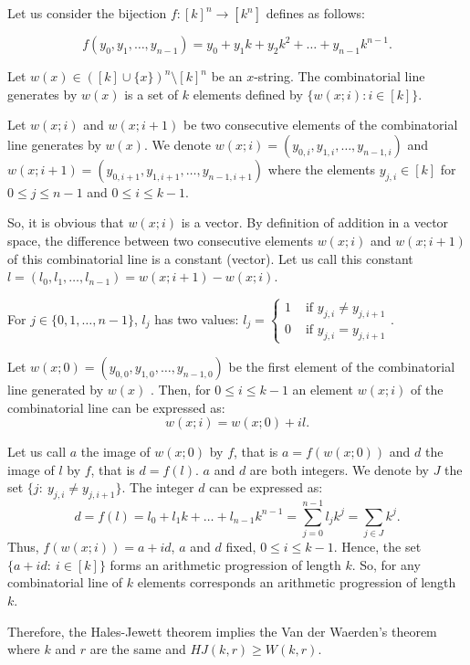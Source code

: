 Let us consider the bijection $f:[k]^n \longrightarrow [k^n]$ defines as follows:

$$f(y_0,y_1,\ldots, y_{n-1})=y_0+y_1k+y_2 k^2+\ldots+y_{n-1}k^{n-1}.$$

Let $w(x) \in ([k] \cup \{x\})^n\setminus [k]^n$ be an $x$-string. The combinatorial line generates by $w(x)$ is a set of $k$ elements defined by  $\{w(x;i):i\in [k]\}.$  

Let $w(x;i)$ and $w(x;i+1)$ be two consecutive elements of the combinatorial line generates by $w(x)$. We denote  $w(x;i)=(y_{0,i},y_{1,i},\ldots, y_{n-1,i}) $ and $w(x;i+1)=(y_{0,i+1},y_{1,i+1},\ldots, y_{n-1,i+1})$ where  the elements  $y_{j,i} \in [k]$ for $0 \leq j \leq n-1$ and $0 \leq i \leq k-1.$

So, it is obvious that $w(x;i)$ is a vector. By definition of addition in a vector space, the difference between two consecutive elements $w(x;i)$ and $w(x;i+1)$ of this combinatorial line is a constant (vector). Let us call this constant $l=(l_0, l_1, \ldots, l_{n-1})= w(x;i+1)-w(x;i)$.


For $j\in \{0,1,\ldots, n-1\}$, $l_j$ has two values: 
$l_j= \left\lbrace \begin{array}{ll}1 & \text{ if } y_{j,i}\neq y_{j,i+1} \\ 0 & \text{ if } y_{j,i} =  y_{j,i+1}   \end{array} \right. .$

Let $w(x;0)=(y_{0,0},y_{1,0},\ldots, y_{n-1,0})$ be the first element of the combinatorial line generated by $w(x)$ . Then, for $0\leq i \leq k-1$ an element $w(x;i)$ of the combinatorial line can be expressed as: $$w(x;i)=w(x;0)+il.$$

Let us call  $a$ the image of $w(x;0)$ by $f$, that is $a=f(w(x;0))$ and  $d$ the image of $l$ by $f$, that is $d=f(l).$ $a$ and $d$ are both integers.  We denote by $J$ the set $\{j: \ y_{j,i}\neq y_{j,i+1} \}.$ The integer $d$ can be expressed as:
$$d=f(l)=l_0+l_1k+\ldots+l_{n-1}k^{n-1}=\sum_{j=0}^{n-1}l_jk^j= \sum_{j\in J} k^j.$$
Thus, $f(w(x;i))=a+id$, $a$ and $d$ fixed, $0\leq i \leq k-1$. Hence, the set $\{a+id: \ i\in [k]\}$ forms an arithmetic progression of length $k.$ So, for any combinatorial line of $k$ elements corresponds an arithmetic progression of length $k.$

Therefore, the Hales-Jewett theorem implies the Van der Waerden's theorem where $k$ and $r$ are the same and $HJ(k,r) \geq W(k,r).$

